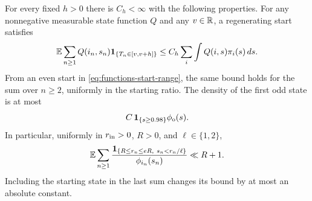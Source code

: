 \begin{lemma}\label{lem:band-bounds}
For every fixed \(h>0\) there is \(C_h<\infty\) with the following
properties.  For any nonnegative measurable state function \(Q\)
and any \(v\in\mathbb R\), a regenerating start satisfies
\begin{equation}\label{eq:functions-band-from-regeneration}
 \mathbb E\sum_{n\ge1}Q(i_n,s_n)
        \mathbf 1_{\{T_n\in[v,v+h]\}}
 \le C_h\sum_i\int Q(i,s)\pi_i(s)\,ds.
\end{equation}
From an even start in \eqref{eq:functions-start-range}, the same
bound holds for the sum over \(n\ge2\), uniformly in the starting
ratio.  The density of the first odd state is at most
\[
 C\,\mathbf 1_{\{s\ge0.98\}}\phi_\mathrm o(s).
\]
In particular, uniformly in \(r_{\rm in}>0\), \(R>0\), and
\(\ell\in\{1,2\}\),
\begin{equation}\label{eq:functions-inverse-phi-band}
 \mathbb E\sum_{n\ge1}
 \frac{\mathbf 1_{\{R\le r_n\le eR,\ s_n<r_n/\ell\}}}
      {\phi_{i_n}(s_n)}
 \ll R+1.
\end{equation}
Including the starting state in the last sum changes its bound
by at most an absolute constant.
\end{lemma}

